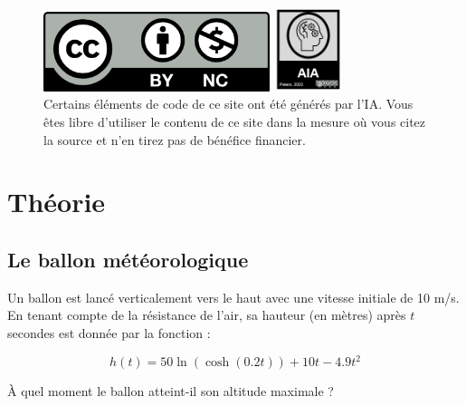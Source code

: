 \documentclass[
  12pt,
  letterpaper,
]{book}
\theoremstyle{remark}
\begin{document}
\begin{figure}

\begin{minipage}{0.50\linewidth}

\includegraphics[width=2.60417in,height=\textheight]{by-nc.png}

\end{minipage}%
%
\begin{minipage}{0.50\linewidth}

\includegraphics[width=0.78125in,height=\textheight]{AIA.jpg}

\end{minipage}%

\caption{\label{fig-ccIA}Certains éléments de code de ce site ont été
générés par l'IA. Vous êtes libre d'utiliser le contenu de ce site dans
la mesure où vous citez la source et n'en tirez pas de bénéfice
financier.}

\end{figure}%

\part{Théorie}

\chapter{Le ballon météorologique}\label{le-ballon-muxe9tuxe9orologique}

Un ballon est lancé verticalement vers le haut avec une vitesse initiale
de 10 m/s. En tenant compte de la résistance de l'air, sa hauteur (en
mètres) après \(t\) secondes est donnée par la fonction :

\[h(t) = 50\ln(\cosh(0.2t)) + 10t - 4.9t^2\]

À quel moment le ballon atteint-il son altitude maximale ?
\end{document}
